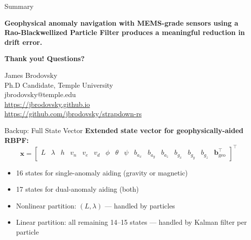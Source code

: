 \documentclass[aspectratio=169]{beamer}
\begin{document}
\begin{frame}{Summary}
    \begin{center}
        \Large
        \textbf{Geophysical anomaly navigation with MEMS-grade sensors using a Rao-Blackwellized Particle Filter produces a meaningful reduction in drift error.}
    \end{center}
    \vspace{1em}
    \begin{center}
        \Large \textbf{Thank you! Questions?}
    \end{center}
    \vspace{1em}
    \begin{center}
        \small
        James Brodovsky\\
        Ph.D Candidate, Temple University\\
        jbrodovsky@temple.edu \\
        \vspace{.5em}
        \url{https://jbrodovsky.github.io} \\
        \url{https://github.com/jbrodovsky/strapdown-rs}
    \end{center}
\end{frame}

\appendix

\begin{frame}{Backup: Full State Vector}
    \textbf{Extended state vector for geophysically-aided RBPF:}
    \[
    \mathbf{x} = \left[\begin{array}{cccccccccccccccc}
      L & \lambda & h & v_n & v_e & v_d & \phi & \theta & \psi & b_{a_x} & b_{a_y} & b_{a_z} & b_{g_x} & b_{g_y} & b_{g_z} & \mathbf{b}_{\text{geo}}^\top
    \end{array}\right]^\top
    \]
    \begin{itemize}
        \item 16 states for single-anomaly aiding (gravity or magnetic)
        \item 17 states for dual-anomaly aiding (both)
        \item Nonlinear partition: $(L, \lambda)$ --- handled by particles
        \item Linear partition: all remaining 14--15 states --- handled by Kalman filter per particle
    \end{itemize}
\end{frame}
\end{document}
